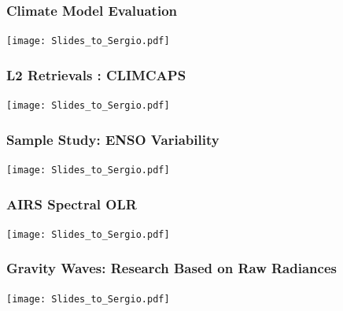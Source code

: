 \documentclass[10pt,t]{beamer}
\begin{document}
\begin{frame}
\frametitle{Climate Model Evaluation}  
\vspace{-0.35in}
\begin{center}
\texttt{[image: Slides\_to\_Sergio.pdf]}
\end{center}
\end{frame}
\begin{frame}
\frametitle{L2 Retrievals : CLIMCAPS}  
\vspace{-0.35in}
\begin{center}
\texttt{[image: Slides\_to\_Sergio.pdf]}
\end{center}
\end{frame}
\begin{frame}
\frametitle{Sample Study: ENSO Variability}  
\vspace{-0.35in}
\begin{center}
\texttt{[image: Slides\_to\_Sergio.pdf]}
\end{center}
\end{frame}
\begin{frame}
\frametitle{AIRS Spectral OLR}  
\vspace{-0.35in}
\begin{center}
\texttt{[image: Slides\_to\_Sergio.pdf]}
\end{center}
\end{frame}
\begin{frame}
\frametitle{Gravity Waves: Research Based on Raw Radiances}  
\vspace{-0.35in}
\begin{center}
\texttt{[image: Slides\_to\_Sergio.pdf]}
\end{center}
\end{frame}
\end{document}
